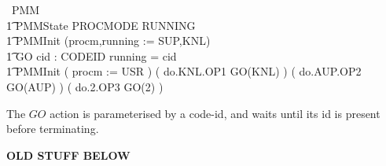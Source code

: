 \begin{circus}
\circprocess\ PMM \circdef \circbegin \\
\t1 \circstate PMMState  PROCMODE \land RUNNING \\
\t1 PMMInit \circdef (procm,running := SUP,KNL) \\
\t1 GO \circdef
   cid : CODEID \circspot
      \lcircguard running = cid \rcircguard \circguard \Skip \\
\t1 \circspot PMMInit \circseq
               ( procm := USR )
               \circseq ( do.KNL.OP1 \then GO(KNL) )
               \circseq ( do.AUP.OP2 \then GO(AUP) )
               \circseq ( do.2.OP3 \then GO(2) )\\
\circend
\end{circus}


The $GO$ action is parameterised by a code-id,
and waits until its id is present before terminating.


\newpage
\textbf{OLD STUFF BELOW}

